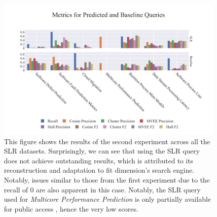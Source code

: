 \documentclass[%
  a4paper,fontsize=11pt,abstract=on,%
  oneside,BCOR=19mm,%
]{scrreprt}
\begin{document}
\begin{figure}
	\centering	
	\includegraphics[scale=0.7]{pics/all-metrics-2.pdf}
	\caption[Evaluation: Experiment 2]{This figure shows the results of the second experiment across all the SLR datasets. Surprisingly, we can see that using the SLR query does not achieve outstanding results, which is attributed to its reconstruction and adaptation to fit dimension's search engine. Notably, issues similar to those from the first experiment due to the recall of 0 are also apparent in this case. Notably, the SLR query used for \textit{Multicore Performance Prediction} is only partially available for public access \autocite{Frank2017}, hence the very low scores.}\label{fig:all-metrics-2}
\end{figure}
\end{document}
